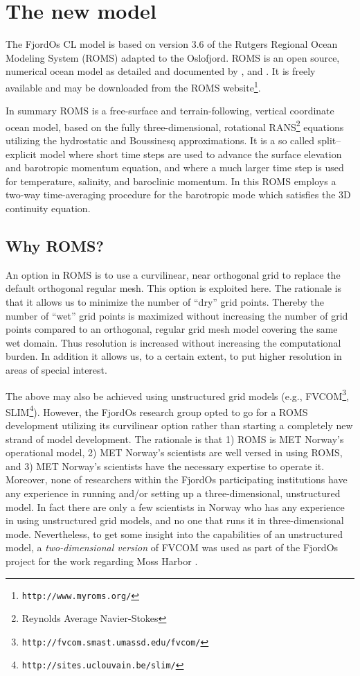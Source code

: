 \clearpage
\section{The new model}
\label{sec:model}
The FjordOs CL model is based on version 3.6 of the Rutgers Regional Ocean Modeling System (ROMS) adapted to the Oslofjord. ROMS is an open source, numerical ocean model as detailed and documented by \cite{haidv:etal:2008}, \cite{shche:mcwil:2003} and \cite{shche:mcwil:2005, shche:mcwil:2009}. It is freely available and may be downloaded from the ROMS website\footnote{\texttt{http://www.myroms.org/}}. 

In summary ROMS is a free-surface and terrain-following, vertical coordinate ocean model, based on the fully three-dimensional, rotational RANS\footnote{Reynolds Average Navier-Stokes} equations utilizing the hydrostatic and Boussinesq approximations. It is a so called split–explicit model where short time steps are used to advance the surface elevation and barotropic momentum equation, and where a much larger time step is used for temperature, salinity, and baroclinic momentum. In this ROMS employs a two-way time-averaging procedure for the barotropic mode which satisfies the 3D continuity equation. 

\subsection{Why ROMS?}
An option in ROMS is to use a curvilinear, near orthogonal grid to replace the default orthogonal regular mesh. This option is exploited here. The rationale is that it allows us to minimize the number of ``dry'' grid points. Thereby the number of ``wet'' grid points is maximized without increasing the number of grid points compared to an orthogonal, regular grid mesh model covering the same wet domain. Thus resolution is increased without increasing the computational burden. In addition it allows us, to a certain extent, to put higher resolution in areas of special interest.
%

The above may also be achieved using unstructured grid models (e.g., FVCOM\footnote{\texttt{http://fvcom.smast.umassd.edu/fvcom/}}, SLIM\footnote{\texttt{http://sites.uclouvain.be/slim/}}). However, the FjordOs research group opted to go for a ROMS development utilizing its curvilinear option rather than starting a completely new strand of model development. The rationale is that 1) ROMS is MET Norway's operational model, 2) MET Norway's scientists are well versed in using ROMS, and 3) MET Norway's scientists have the necessary expertise to operate it. Moreover, none of researchers within the FjordOs participating institutions have any experience in running and/or setting up a three-dimensional, unstructured model. In fact there are only a few scientists in Norway who has any experience in using unstructured grid models, and no one that runs it in three-dimensional mode. Nevertheless, to get some insight into the capabilities of an unstructured model, a \emph{two-dimensional version} of FVCOM was used as part of the FjordOs project for the work regarding Moss Harbor \citep{hjelm:etal:2014}.  
   

